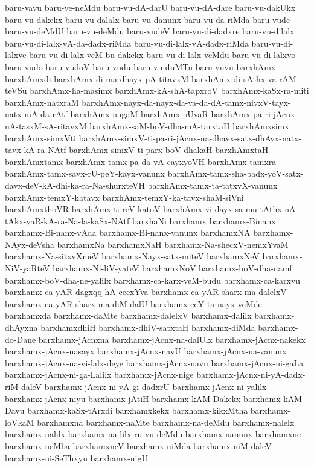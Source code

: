 {baru-vavu
baru-ve-neMdu
baru-vu-dA-darU
baru-vu-dA-dare
baru-vu-dakUkx
baru-vu-dakekx
baru-vu-dalalx
baru-vu-danunx
baru-vu-da-riMda
baru-vude
baru-vu-deMdU
baru-vu-deMdu
baru-vudeV
baru-vu-di-dadxre
baru-vu-dilalx
baru-vu-di-lalx-vA-da-dadx-riMda
baru-vu-di-lalx-vA-dadx-riMda
baru-vu-di-lalxve
baru-vu-di-lalx-veM-bu-dakekx
baru-vu-di-lalx-veMdu
baru-vu-di-lalxvo
baru-vudo
baru-vudoV
baru-vudu
baru-vu-duMTu
baru-vuvu
barxhAmx
barxhAmxdi
barxhAmx-di-ma-dhayx-pA-titavxM
barxhAmx-di-sAthx-va-rAM-teVSu
barxhAmx-ha-masimx
barxhAmx-kA-shA-tapxroV
barxhAmx-kaSx-ra-miti
barxhAmx-natxraM
barxhAmx-nayx-da-nayx-da-va-da-dA-tamx-nivxV-tayx-natx-mA-da-rAtf
barxhAmx-nugaM
barxhAmx-pUvaR
barxhAmx-pa-ri-jAcnx-nA-tasxM-sA-ritavxM
barxhAmx-saM-boV-dha-mA-tarxtaH
barxhAmxsimx
barxhAmx-simxVti
barxhAmx-simxV-ti-pa-ri-jAcnx-na-dhavx-satx-dhAvx-natx-tavx-kA-ra-NAtf
barxhAmx-simxV-ti-parx-boV-dhakaH
barxhAmxtaH
barxhAmxtamx
barxhAmx-tamx-pa-da-vA-cayxyoVH
barxhAmx-tamxra
barxhAmx-tamx-savx-rU-peY-kayx-vanunx
barxhAmx-tamx-sha-badx-yoV-satx-davx-deV-kA-dhi-ka-ra-Na-shurxteVH
barxhAmx-tamx-ta-tatxvX-vanunx
barxhAmx-temxY-katavx
barxhAmx-temxY-ka-tavx-shaM-siVni
barxhAmxthoVR
barxhAmx-ti-reV-katoV
barxhAmx-vi-dayx-sa-mu-tAthx-nA-tAkx-yaR-kA-ra-Na-la-kaSx-NAtf
barxhaNi
barxhamx
barxhamx-Binanx
barxhamx-Bi-nanx-vAda
barxhamx-Bi-nanx-vanunx
barxhamxNA
barxhamx-NAyx-deVsha
barxhamxNa
barxhamxNaH
barxhamx-Na-shecxV-nemxYvaM
barxhamx-Na-sitxvXmeV
barxhamx-Nayx-satx-miteV
barxhamxNeV
barxhamx-NiV-yaRteV
barxhamx-Ni-liV-yateV
barxhamxNoV
barxhamx-boV-dha-namf
barxhamx-boV-dha-ne-yalilx
barxhamx-ca-karx-veM-budu
barxhamx-ca-karxvu
barxhamx-ca-yAR-dagxqq-hA-cecxYva
barxhamx-ca-yAR-sharx-ma-dalelxV
barxhamx-ca-yAR-sharx-ma-diM-dalU
barxhamx-ceY-ta-nayx-veMde
barxhamxda
barxhamx-daMte
barxhamx-dalelxV
barxhamx-dalilx
barxhamx-dhAyxna
barxhamxdhiH
barxhamx-dhiV-satxtaH
barxhamx-diMda
barxhamx-do-Dane
barxhamx-jAcnxna
barxhamx-jAcnx-na-dalUlx
barxhamx-jAcnx-nakekx
barxhamx-jAcnx-nasayx
barxhamx-jAcnx-navU
barxhamx-jAcnx-na-vanunx
barxhamx-jAcnx-na-vi-lalx-deye
barxhamx-jAcnx-navu
barxhamx-jAcnx-ni-gaLa
barxhamx-jAcnx-ni-ga-Lalilx
barxhamx-jAcnx-nige
barxhamx-jAcnx-ni-yA-dadx-riM-daleV
barxhamx-jAcnx-ni-yA-gi-dadxrU
barxhamx-jAcnx-ni-yalilx
barxhamx-jAcnx-niyu
barxhamx-jAtiH
barxhamx-kAM-Dakekx
barxhamx-kAM-Davu
barxhamx-kaSx-tArxdi
barxhamxkekx
barxhamx-kikxMtha
barxhamx-loVkaM
barxhamxna
barxhamx-naMte
barxhamx-na-deMdu
barxhamx-nalelx
barxhamx-nalilx
barxhamx-na-lilx-ru-vu-deMdu
barxhamx-nanunx
barxhamxne
barxhamx-neMba
barxhamxneV
barxhamx-niMda
barxhamx-niM-daleV
barxhamx-ni-SeThxyu
barxhamx-nigU
}
